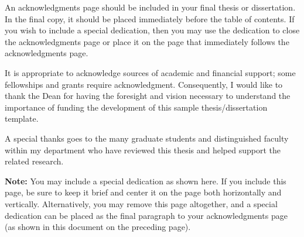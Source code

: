 \renewcommand{\thesisacknowledgmentpostscript}{
\textbf{Reminders of what needs to be updated:}
After removing these comments, use the above format to help input your
acknowledgments page.   A special dedication can be placed as the final
paragraph, as shown above; alternatively, you may include a special dedication
on the page that follows, as also shown in this sample template.}

\begin{thesisacknowledgments}
An acknowledgments page should be included in your final thesis or
dissertation.  In the final copy, it should be placed immediately before the
table of contents.  If you wish to include a special dedication, then you may
use the dedication to close the acknowledgments page or place it on the page
that immediately follows the acknowledgments page.  

It is appropriate to acknowledge sources of academic and financial support;
some fellowships and grants require acknowledgment.  Consequently, I would like
to thank the Dean for having the foresight and vision necessary to understand
the importance of funding the development of this sample thesis/dissertation
template.

A special thanks goes to the many graduate students and distinguished faculty
within my department who have reviewed this thesis and helped support the
related research.
\end{thesisacknowledgments}

\begin{thesisdedicationpage}                %
\textbf{Note:} You may include a special dedication as shown here.  If you
include this page, be sure to keep it brief and center it on the page both
horizontally and vertically.  Alternatively, you may remove this page
altogether, and a special dedication can be placed as the final paragraph to
your acknowledgments page (as shown in this document on the preceding page).
\end{thesisdedicationpage}

